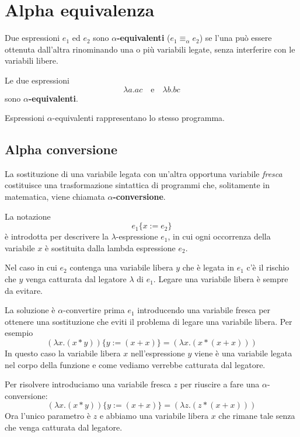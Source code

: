 \section{Alpha equivalenza}
Due espressioni $e_1$ ed $e_2$ sono \textbf{$\alpha$-equivalenti} ($e_1 \equiv_\alpha e_2$) se l'una può essere
ottenuta dall'altra rinominando una o più variabili legate, senza interferire con le variabili libere.

Le due espressioni
\[ \lambda a.ac \quad \text{e} \quad \lambda b.bc \]
sono \textbf{$\alpha$-equivalenti}.

Espressioni $\alpha$-equivalenti rappresentano lo stesso programma.

\subsection{Alpha conversione}
La sostituzione di una variabile legata con un'altra opportuna variabile \emph{fresca} costituisce una
trasformazione sintattica di programmi che, solitamente in matematica, viene chiamata \textbf{$\alpha$-conversione}.

La notazione
\[ e_1 \{ x := e_2 \} \]
è introdotta per descrivere la $\lambda$-espressione $e_1$, in cui ogni occorrenza della variabile $x$ è sostituita
dalla lambda espressione $e_2$.

Nel caso in cui $e_2$ contenga una variabile libera $y$ che è legata in $e_1$ c'è il rischio che $y$ venga catturata
dal legatore $\lambda$ di $e_1$. Legare una variabile libera è sempre da evitare.

La soluzione è $\alpha$-convertire prima $e_1$ introducendo una variabile fresca per ottenere una sostituzione che
eviti il problema di legare una variabile libera. Per esempio
\[ (\lambda x.(x * y)) \{ y := (x + x) \} = (\lambda x.(x * (x + x))) \]
In questo caso la variabile libera $x$ nell'espressione $y$ viene è una variabile legata nel corpo della funzione
e come vediamo verrebbe catturata dal legatore.

Per risolvere introduciamo una variabile fresca $z$ per riuscire a fare una $\alpha$-conversione:
\[ (\lambda x.(x * y)) \{ y := (x + x) \} = (\lambda z.(z * (x + x))) \]
Ora l'unico parametro è $z$ e abbiamo una variabile libera $x$ che rimane tale senza che venga catturata dal
legatore.